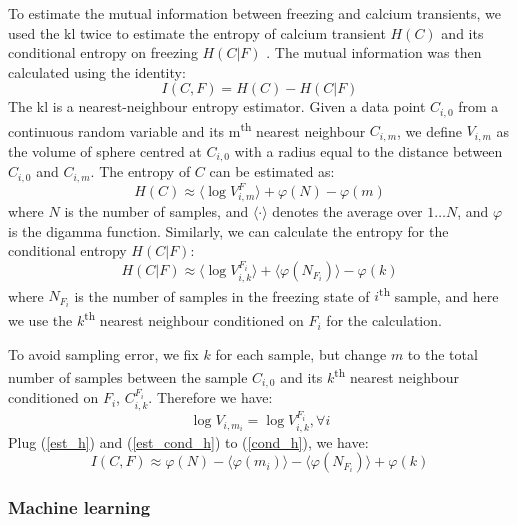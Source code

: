 To estimate the mutual information between freezing and calcium transients, we used the \gls{kl} twice to estimate the entropy of calcium transient $H(C)$ and its conditional entropy on freezing $H(C|F)$ \citep{victor02, ross14}. The mutual information was then calculated using the identity:
\begin{equation} \label{cond_h}
    I(C, F) = H(C) - H(C|F)
\end{equation}
The \gls{kl} is a nearest-neighbour entropy estimator. Given a data point $C_{i,0}$ from a continuous random variable and its m\textsuperscript{th} nearest neighbour $C_{i,m}$, we define $V_{i,m}$ as the volume of sphere centred at $C_{i,0}$ with a radius equal to the distance between $C_{i,0}$ and $C_{i,m}$. The entropy of $C$ can be estimated as:
\begin{equation} \label{est_h}
    H(C) \approx \langle \log V_{i,m}^F\rangle + \varphi(N) - \varphi(m)
\end{equation}
where $N$ is the number of samples, and $\langle\cdot\rangle$ denotes the average over $1\ldots N$, and $\varphi$ is the digamma function. Similarly, we can calculate the entropy for the conditional entropy $H(C|F)$:
\begin{equation} \label{est_cond_h}
    H(C|F) \approx \langle \log V_{i,k}^{F_i} \rangle + \langle \varphi(N_{F_i}) \rangle - \varphi(k)
\end{equation}
where $N_{F_i}$ is the number of samples in the freezing state of $i$\textsuperscript{th} sample, and here we use the $k$\textsuperscript{th} nearest neighbour conditioned on $F_i$ for the calculation.

To avoid sampling error, we fix $k$ for each sample, but change $m$ to the total number of samples between the sample $C_{i,0}$ and its $k$\textsuperscript{th} nearest neighbour conditioned on $F_i$, $C_{i,k}^{F_i}$. Therefore we have:
\begin{equation*}
\log V_{i, m_i} = \log V_{i, k}^{F_i}, \forall i 
\end{equation*}
Plug (\ref{est_h}) and (\ref{est_cond_h}) to (\ref{cond_h}), we have:
\begin{equation*}
    I(C, F) \approx \varphi(N) - \langle\varphi(m_i)\rangle - \langle\varphi(N_{F_i})\rangle + \varphi(k)
\end{equation*}




\subsubsection{Machine learning}

